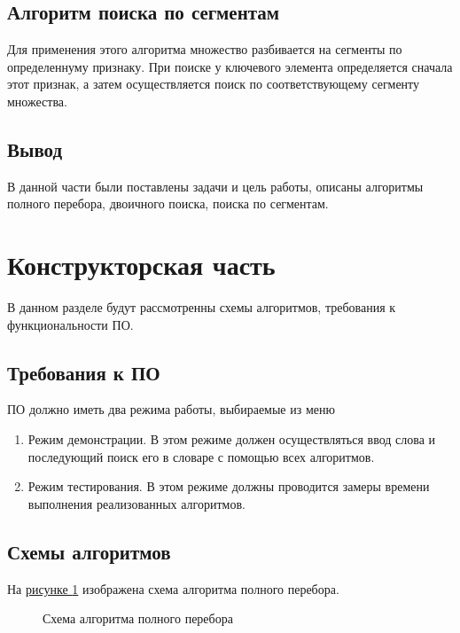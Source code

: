 \documentclass{article}
\begin{document}
		\subsection{Алгоритм поиска по сегментам}
		\indent Для применения этого алгоритма множество разбивается на сегменты по определеннуму признаку. При поиске у ключевого элемента определяется сначала этот признак, а затем осуществляется поиск по соответствующему сегменту множества.
	\subsection{Вывод}
	В данной части были поставлены задачи и цель работы, описаны алгоритмы полного перебора, двоичного поиска, поиска по сегментам.
	\newpage
	\section{Конструкторская часть}
		В данном разделе будут рассмотренны схемы алгоритмов, требования к функциональности ПО.
		\subsection{Требования к ПО} 
		ПО должно иметь два режима работы, выбираемые из меню
		\begin{enumerate}
			\item Режим демонстрации. В этом режиме должен осуществляться ввод слова и последующий поиск его в словаре с помощью всех алгоритмов.
		 	\item Режим тестирования. В этом режиме должны проводится замеры времени выполнения реализованных алгоритмов.
	 	\end{enumerate}
		\subsection{Схемы алгоритмов}
		На \hyperref[bruteForceAlg]{рисунке \ref{bruteForceAlg}} изображена схема алгоритма полного перебора.
	\begin{figure}[h!]
		\caption{Схема алгоритма полного перебора}
		\label{bruteForceAlg}
	\end{figure}
	\newpage
\end{document}
